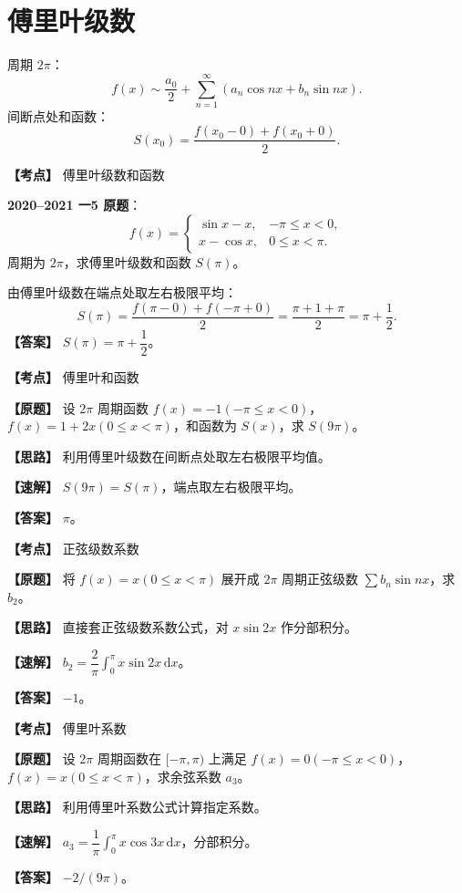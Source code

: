 ﻿\documentclass[11pt,a4paper,UTF8]{ctexart}
\newcommand{\dd}{\,\mathrm d}
\begin{document}
\section{傅里叶级数}

\begin{templatebox}[傅里叶题模板]
周期 $2\pi$：
\[
f(x)\sim\frac{a_0}{2}+\sum_{n=1}^{\infty}(a_n\cos nx+b_n\sin nx).
\]
间断点处和函数：
\[
S(x_0)=\frac{f(x_0-0)+f(x_0+0)}2.
\]
\end{templatebox}

\begin{answerbox}[2020--2021 一-5]
\textbf{【考点】} 傅里叶级数和函数

\textbf{2020--2021 一5 原题}：
\[
f(x)=\begin{cases}
\sin x-x,&-\pi\le x<0,\\
x-\cos x,&0\le x<\pi.
\end{cases}
\]
周期为 $2\pi$，求傅里叶级数和函数 $S(\pi)$。

由傅里叶级数在端点处取左右极限平均：
\[
S(\pi)=\frac{f(\pi-0)+f(-\pi+0)}2
=\frac{\pi+1+\pi}{2}=\pi+\frac12.
\]
\textbf{【答案】} $S(\pi)=\pi+\dfrac12$。

\end{answerbox}

\newpage

\begin{answerbox}[2024--2025 一-6]
\textbf{【考点】} 傅里叶和函数

\textbf{【原题】} 设 $2\pi$ 周期函数 $f(x)=-1(-\pi\le x<0)$，$f(x)=1+2x(0\le x<\pi)$，和函数为 $S(x)$，求 $S(9\pi)$。

\textbf{【思路】} 利用傅里叶级数在间断点处取左右极限平均值。

\textbf{【速解】} $S(9\pi)=S(\pi)$，端点取左右极限平均。

\textbf{【答案】} $\pi$。
\end{answerbox}

\begin{answerbox}[2023--2024 一-5]
\textbf{【考点】} 正弦级数系数

\textbf{【原题】} 将 $f(x)=x(0\le x<\pi)$ 展开成 $2\pi$ 周期正弦级数 $\sum b_n\sin nx$，求 $b_2$。

\textbf{【思路】} 直接套正弦级数系数公式，对 $x\sin2x$ 作分部积分。

\textbf{【速解】} $b_2=\dfrac2\pi\int_0^\pi x\sin2x\dd x$。

\textbf{【答案】} $-1$。
\end{answerbox}

\begin{answerbox}[2022--2023 一-6]
\textbf{【考点】} 傅里叶系数

\textbf{【原题】} 设 $2\pi$ 周期函数在 $[-\pi,\pi)$ 上满足 $f(x)=0(-\pi\le x<0)$，$f(x)=x(0\le x<\pi)$，求余弦系数 $a_3$。

\textbf{【思路】} 利用傅里叶系数公式计算指定系数。

\textbf{【速解】} $a_3=\dfrac1\pi\int_0^\pi x\cos3x\dd x$，分部积分。

\textbf{【答案】} $-2/(9\pi)$。
\end{answerbox}
\end{document}
